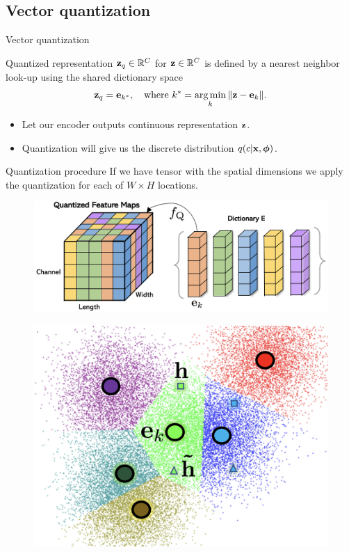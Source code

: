 \subsection{Vector quantization}
\begin{frame}{Vector quantization}
	\begin{block}{Quantized representation}
		$\mathbf{z}_q \in \mathbb{R}^{C}$  for $\mathbf{z} \in \mathbb{R}^C$ is defined by a nearest neighbor look-up using the shared dictionary space
		\vspace{-0.3cm}
		\[
		\mathbf{z}_q = \mathbf{e}_{k^*}, \quad \text{where } k^* = \operatorname*{arg\,min}_k \| \mathbf{z} - \mathbf{e}_k \|.
		\] 
		\vspace{-0.7cm}
	\end{block}
	\begin{itemize}
		\item Let our encoder outputs continuous representation $\mathbf{z}$. 
		\item Quantization will give us the discrete distribution $q(c | \mathbf{x}, \boldsymbol{\phi})$.
	\end{itemize}
	\vspace{-0.2cm}
	\begin{block}{Quantization procedure}
		If we have tensor with the spatial dimensions we apply the quantization for each of $W \times H$ locations.
		\begin{minipage}[t]{0.65\columnwidth}
			\begin{figure}
				\includegraphics[width=0.8\linewidth]{figs/fqgan_cnn.png}
			\end{figure}
		\end{minipage}%
		\begin{minipage}[t]{0.35\columnwidth}
			\begin{figure}
				\includegraphics[width=0.7\linewidth]{figs/fqgan_lookup}
			\end{figure}
		\end{minipage}
	\end{block}
\end{frame}
